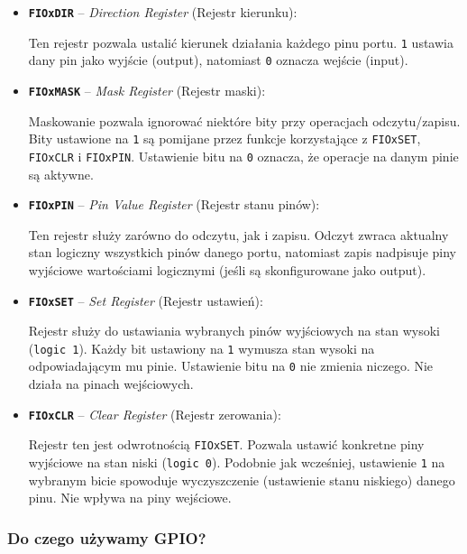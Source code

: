 \begin{itemize}
    \item \textbf{\texttt{FIOxDIR}} – \textit{Direction Register} (Rejestr kierunku):

    Ten rejestr pozwala ustalić kierunek działania każdego pinu portu. 
    \texttt{1} ustawia dany pin jako wyjście (output), natomiast \texttt{0} oznacza wejście (input). 


    \item \textbf{\texttt{FIOxMASK}} – \textit{Mask Register} (Rejestr maski):

    Maskowanie pozwala ignorować niektóre bity przy operacjach odczytu/zapisu. 
    Bity ustawione na \texttt{1} są pomijane przez funkcje korzystające z \texttt{FIOxSET}, \texttt{FIOxCLR} i \texttt{FIOxPIN}. 
    Ustawienie bitu na \texttt{0} oznacza, że operacje na danym pinie są aktywne.


    \item \textbf{\texttt{FIOxPIN}} – \textit{Pin Value Register} (Rejestr stanu pinów):

    Ten rejestr służy zarówno do odczytu, jak i zapisu. 
    Odczyt zwraca aktualny stan logiczny wszystkich pinów danego portu, natomiast zapis nadpisuje piny wyjściowe wartościami logicznymi (jeśli są skonfigurowane jako output).


    \item \textbf{\texttt{FIOxSET}} – \textit{Set Register} (Rejestr ustawień):

    Rejestr służy do ustawiania wybranych pinów wyjściowych na stan wysoki (\texttt{logic 1}). 
    Każdy bit ustawiony na \texttt{1} wymusza stan wysoki na odpowiadającym mu pinie. 
    Ustawienie bitu na \texttt{0} nie zmienia niczego. Nie działa na pinach wejściowych.


    \item \textbf{\texttt{FIOxCLR}} – \textit{Clear Register} (Rejestr zerowania):

    Rejestr ten jest odwrotnością \texttt{FIOxSET}. Pozwala ustawić konkretne piny wyjściowe na stan niski (\texttt{logic 0}). 
    Podobnie jak wcześniej, ustawienie \texttt{1} na wybranym bicie spowoduje wyczyszczenie (ustawienie stanu niskiego) danego pinu. 
    Nie wpływa na piny wejściowe.

\end{itemize}

\subsubsection{Do czego używamy GPIO?}



